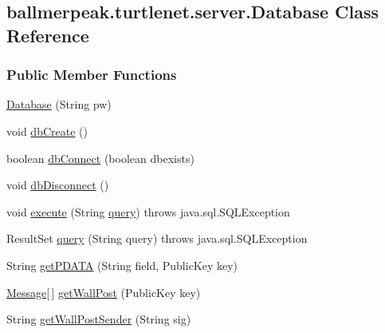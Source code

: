 \hypertarget{classballmerpeak_1_1turtlenet_1_1server_1_1Database}{\subsection{ballmerpeak.\-turtlenet.\-server.\-Database Class Reference}
\label{classballmerpeak_1_1turtlenet_1_1server_1_1Database}
}
\subsubsection*{Public Member Functions}
\begin{DoxyCompactItemize}
\item 
\hyperlink{classballmerpeak_1_1turtlenet_1_1server_1_1Database_a2df6c740699204eafab513d8990f14a8}{Database} (String pw)
\item 
void \hyperlink{classballmerpeak_1_1turtlenet_1_1server_1_1Database_af796c23330bbae7271011b0e81901643}{db\-Create} ()
\item 
boolean \hyperlink{classballmerpeak_1_1turtlenet_1_1server_1_1Database_a80e93295b9fd81f2a3c73bcaa2df39ee}{db\-Connect} (boolean dbexists)
\item 
void \hyperlink{classballmerpeak_1_1turtlenet_1_1server_1_1Database_a1900530bc7bf5c275a275b788086f6ec}{db\-Disconnect} ()
\item 
void \hyperlink{classballmerpeak_1_1turtlenet_1_1server_1_1Database_a717872aaaaf6529490c31465f2952219}{execute} (String \hyperlink{classballmerpeak_1_1turtlenet_1_1server_1_1Database_a4401c37a89ca60d2e6b926b9930446dc}{query})  throws java.\-sql.\-S\-Q\-L\-Exception 
\item 
Result\-Set \hyperlink{classballmerpeak_1_1turtlenet_1_1server_1_1Database_a4401c37a89ca60d2e6b926b9930446dc}{query} (String query)  throws java.\-sql.\-S\-Q\-L\-Exception 
\item 
String \hyperlink{classballmerpeak_1_1turtlenet_1_1server_1_1Database_ab2e0d804fa40eb9b08275f2548737b34}{get\-P\-D\-A\-T\-A} (String field, Public\-Key key)
\item 
\hyperlink{classballmerpeak_1_1turtlenet_1_1shared_1_1Message}{Message}\mbox{[}$\,$\mbox{]} \hyperlink{classballmerpeak_1_1turtlenet_1_1server_1_1Database_a095f1356c13e33debb06929244b98150}{get\-Wall\-Post} (Public\-Key key)
\item 
String \hyperlink{classballmerpeak_1_1turtlenet_1_1server_1_1Database_a6c5618c6a7e144ee7eec9e6e4de6314d}{get\-Wall\-Post\-Sender} (String sig)

\end{DoxyCompactItemize}
